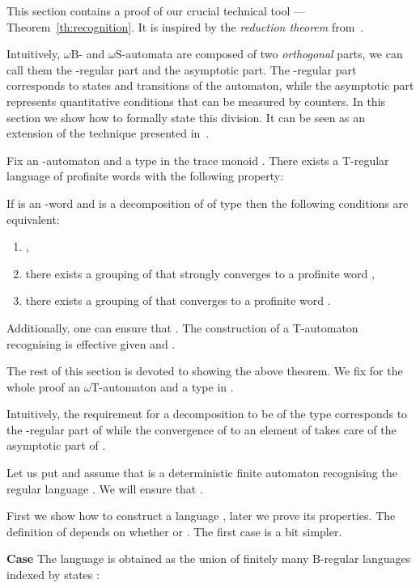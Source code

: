 \documentclass{LMCS}
\newcommand{\wB}{\ensuremath{\omega \mathrm{B}}\xspace}
\newcommand{\wS}{\ensuremath{\omega \mathrm{S}}\xspace}
\newcommand{\wT}{\ensuremath{\omega \mathrm{T}}\xspace}
\newcommand{\fT}{\ensuremath{\mathrm{T}}\xspace}
\newcommand{\fB}{\ensuremath{\mathrm{B}}\xspace}
\begin{document}
This section contains a proof of our crucial technical tool --- Theorem~\ref{th:recognition}. It is inspired by the \emph{reduction theorem} from~\cite{torunczyk_limitedness}.

Intuitively, \wB- and \wS-automata are composed of two \emph{orthogonal} parts, we can call them the -regular part and the asymptotic part. The -regular part corresponds to states and transitions of the automaton, while the asymptotic part represents quantitative conditions that can be measured by counters. In this section we show how to formally state this division. It can be seen as an extension of the technique presented in~\cite{bojanczyk_bounds}.

\begin{theorem}\label{th:recognition}
Fix an -automaton  and a type  in the trace monoid . There exists a \fT-regular language of profinite words  with the following property:

If  is an -word and  is a decomposition of  of type  then the following conditions are equivalent:
\begin{enumerate}
\item ,\label{it:in_lang}
\item there exists a grouping  of  that strongly converges to a profinite word ,\label{it:strongly_conv}
\item there exists a grouping  of  that converges to a profinite word .\label{it:conv}
\end{enumerate}

Additionally, one can ensure that . The construction of a \fT-automaton recognising  is effective given  and .
\end{theorem}

The rest of this section is devoted to showing the above theorem. We fix for the whole proof an \wT-automaton  and a type  in .

Intuitively, the requirement for a decomposition  to be of the type  corresponds to the -regular part of  while the convergence of  to an element of  takes care of the asymptotic part of .

Let us put  and assume that  is a deterministic finite automaton recognising the regular language . We will ensure that .

First we show how to construct a language , later we prove its properties. The definition of  depends on whether  or . The first case is a bit simpler.

{\bf Case } The language  is obtained as the union of finitely many \fB-regular languages indexed by states :
\end{document}
